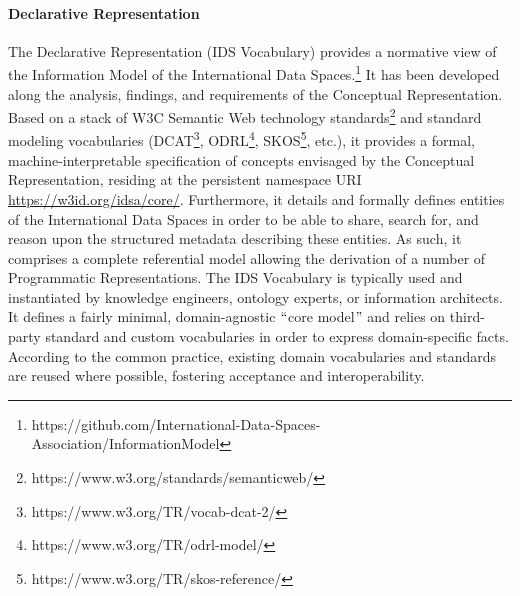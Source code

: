 \paragraph{Declarative Representation\\}
The Declarative Representation (IDS Vocabulary) provides a normative view of the Information Model of the International Data Spaces.\footnote{https://github.com/International-Data-Spaces-Association/InformationModel }
It has been developed along the analysis, findings, and requirements of the Conceptual Representation. Based on a stack of W3C Semantic Web technology standards\footnote{https://www.w3.org/standards/semanticweb/ } and standard modeling vocabularies (DCAT\footnote{https://www.w3.org/TR/vocab-dcat-2/ }, ODRL\footnote{https://www.w3.org/TR/odrl-model/ }, SKOS\footnote{https://www.w3.org/TR/skos-reference/ }, etc.), it provides a formal, machine-interpretable specification of concepts envisaged by the Conceptual Representation, residing at the persistent namespace URI \url{https://w3id.org/idsa/core/}. Furthermore, it details and formally defines entities of the International Data Spaces in order to be able to share, search for, and reason upon the structured metadata describing these entities. As such, it comprises a complete referential model allowing the derivation of a number of Programmatic Representations. The IDS Vocabulary is typically used and instantiated by knowledge engineers, ontology experts, or information architects. It defines a fairly minimal, domain-agnostic $``$core model$"$  and relies on third-party standard and custom vocabularies in order to express domain-specific facts. According to the common practice, existing domain vocabularies and standards are reused where possible, fostering acceptance and interoperability.


